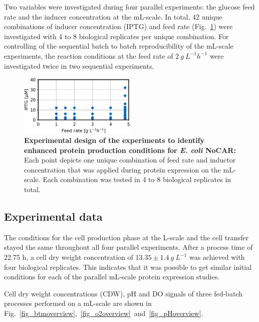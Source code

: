 \documentclass[sn-standardnature]{sn-jnl}%
\theoremstyle{thmstyleone}%
\theoremstyle{thmstyletwo}%
\theoremstyle{thmstylethree}%
\begin{document}
Two variables were investigated during four parallel experiments: the glucose feed rate and the inducer concentration at the mL-scale.
In total, 42 unique combinations of inducer concentration (IPTG) and feed rate (Fig.~\ref{fig_expdesign}) were investigated with 4 to 8 biological replicates per unique combination.
For controlling of the sequential batch to batch reproducibility of the mL-scale experiments, the reaction conditions at the feed rate of 
$2\ g\ L^{-1}h^{-1}$ were investigated twice in two sequential experiments.

\begin{figure}[H]
    \centering
    \includegraphics[width=0.5\textwidth]{figures/ExpDesign.png}
    \caption{
        \textbf{Experimental design of the experiments to identify enhanced protein production conditions for \textit{E. coli} NoCAR:}
        Each point depicts one unique combination of feed rate and inductor concentration that was applied during protein expression on the mL-scale.
        Each combination was tested in 4 to 8 biological replicates in total.
    }
    \label{fig_expdesign}
\end{figure}

\subsection{Experimental data}
The conditions for the cell production phase at the L-scale and the cell transfer stayed the same throughout all four parallel experiments.
After a process time of 22.75 h, a cell dry weight concentration of $13.35 \pm 1.4\ g\ L^{-1}$ was achieved with four biological replicates.
This indicates that it was possible to get similar initial conditions for each of the parallel mL-scale protein expression studies.

Cell dry weight concentrations (CDW), pH and DO signals of three fed-batch processes performed on a mL-scale are shown in Fig.~\ref{fig_btmoverview},~\ref{fig_o2overview}~and~\ref{fig_pHoverview}.
\end{document}
